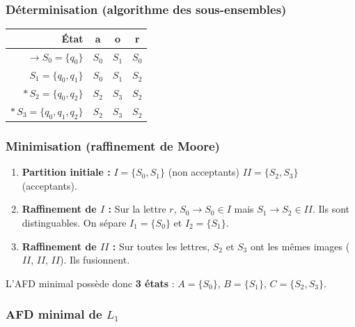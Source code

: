 \documentclass[12pt,a4paper,oneside]{scrartcl}
\begin{document}
\subsubsection*{Déterminisation (algorithme des sous-ensembles)}

\begin{center}
\begin{tabular}{r ccc}
    \toprule
    \textbf{État} & \textbf{a} & \textbf{o} & \textbf{r} \\
    \midrule
    $\to S_0 = \{q_0\}$ & $S_0$ & $S_1$ & $S_0$ \\
    $S_1 = \{q_0,q_1\}$ & $S_0$ & $S_1$ & $S_2$ \\
    $*\, S_2 = \{q_0,q_2\}$ & $S_2$ & $S_3$ & $S_2$ \\
    $*\, S_3 = \{q_0,q_1,q_2\}$ & $S_2$ & $S_3$ & $S_2$ \\
    \bottomrule
\end{tabular}
\end{center}

\subsubsection*{Minimisation (raffinement de Moore)}

\begin{enumerate}
    \item \textbf{Partition initiale :} $I = \{S_0, S_1\}$ (non acceptants) \quad $II = \{S_2, S_3\}$ (acceptants).
    \item \textbf{Raffinement de $I$ :} Sur la lettre $r$, $S_0 \to S_0 \in I$ mais $S_1 \to S_2 \in II$. Ils sont distinguables. On sépare $I_1 = \{S_0\}$ et $I_2 = \{S_1\}$.
    \item \textbf{Raffinement de $II$ :} Sur toutes les lettres, $S_2$ et $S_3$ ont les mêmes images ($II$, $II$, $II$). Ils fusionnent.
\end{enumerate}

L'AFD minimal possède donc \textbf{3 états} : $A = \{S_0\}$, $B = \{S_1\}$, $C = \{S_2, S_3\}$.

\subsubsection*{AFD minimal de $L_1$}

\begin{center}
\end{center}
\end{document}
